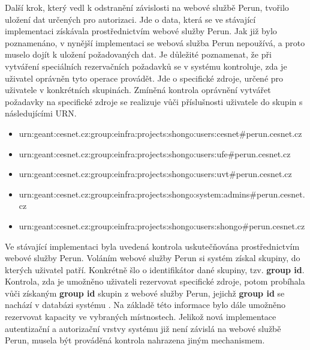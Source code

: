\documentclass[
  printed, %
  twoside, %
  table,   %
  nolof,     %
  nolot,     %
]{fithesis3}
\begin{document}
\par

Další krok, který vedl k odstranění závislosti na webové službě Perun, tvořilo uložení dat určených pro autorizaci. Jde o data, která se ve stávající implementaci získávala prostřednictvím webové služby Perun. Jak již bylo poznamenáno, v nynější implementaci se webová služba Perun nepoužívá, a proto muselo dojít k uložení požadovaných dat. Je důležité poznamenat, že při vytváření speciálních rezervačních požadavků se v systému  kontroluje, zda je uživatel oprávněn tyto operace provádět. Jde o specifické zdroje, určené pro uživatele v konkrétních skupinách. Zmíněná kontrola oprávnění vytvářet požadavky na specifické zdroje se realizuje vůči příslušnosti uživatele do skupin s následujícími URN. 
\begin{itemize}
    \item urn:geant:cesnet.cz:group:einfra:projects:shongo:users:\linebreak cesnet\#perun.cesnet.cz
    \item urn:geant:cesnet.cz:group:einfra:projects:shongo:users:\linebreak ufe\#perun.cesnet.cz
    \item urn:geant:cesnet.cz:group:einfra:projects:shongo:users:\linebreak uvt\#perun.cesnet.cz
    \item urn:geant:cesnet.cz:group:einfra:projects:shongo:system:\linebreak admins\#perun.cesnet.cz
    \item urn:geant:cesnet.cz:group:einfra:projects:shongo:users:\linebreak shongo\#perun.cesnet.cz
\end{itemize}

Ve stávající implementaci byla uvedená kontrola uskutečňována prostřednictvím webové služby Perun. Voláním webové služby Perun si systém  získal skupiny, do kterých uživatel patří. Konkrétně šlo o identifikátor dané skupiny, tzv. \textbf{group id}. Kontrola, zda je umožněno uživateli rezervovat specifické zdroje, potom probíhala vůči získaným \textbf{group id} skupin z webové služby Perun, jejichž \textbf{group id} se nachází v databázi systému . Na základě této informace bylo dále umožněno rezervovat kapacity ve vybraných místnostech. Jelikož nová implementace autentizační a autorizační vrstvy systému  již není závislá na webové službě Perun, musela být prováděná kontrola nahrazena jiným mechanismem. 
\end{document}

